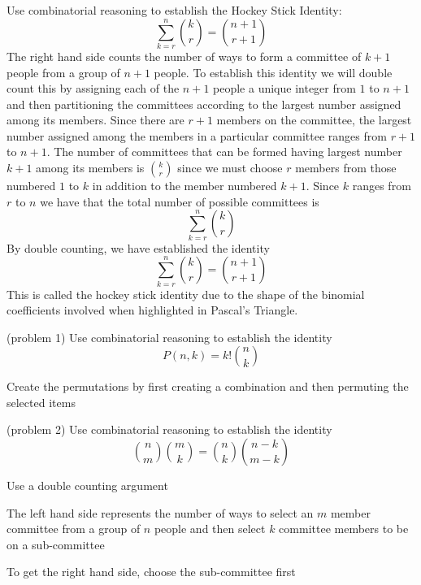 \documentclass[handout]{ximera}
\begin{document}
\begin{example}[example 5]
Use combinatorial reasoning to establish the Hockey Stick Identity:
\[
\sum_{k=r}^{n}\binom{k}{r}=\binom{n+1}{r+1} %
\]
The right hand side counts the number of ways to form a committee of $k+1$ people from a group of $n+1$ people.
To establish this identity we will double count this by assigning each of the $n+1$ people a unique 
integer from $1$ to $n+1$ and then partitioning the committees according to the largest number 
assigned among its members.
Since there are $r+1$ members on the committee, the largest number assigned among the 
members in a particular committee ranges from $r+1$ to $n+1$.
The number of committees that can be formed having largest number $k+1$ among its members
is $\binom{k}{r}$ since we must choose
$r$  members from those numbered $1$ to $k$ in addition to the member numbered $k+1$. 
Since $k$ ranges 
from $r$ to $n$ we have that the total number of possible committees is
\[
\sum_{k=r}^{n}\binom{k}{r}
\]
By double counting, we have established the identity
\[
\sum_{k=r}^{n}\binom{k}{r}=\binom{n+1}{r+1}
\]
This is called the hockey stick identity due to the shape of the binomial 
coefficients involved when highlighted in Pascal's Triangle.
\end{example}


\begin{problem}(problem 1)
Use combinatorial reasoning to establish the identity
\[
P(n,k) = k!\binom{n}{k}
\]
\begin{hint}
Create the permutations by first creating a combination and then permuting the selected items
\end{hint}
\end{problem}

\begin{problem}(problem 2)
Use combinatorial reasoning to establish the identity
\[
\binom{n}{m} \binom{m}{k} = \binom{n}{k} \binom{n-k}{m-k}
\]
\begin{hint}
Use a double counting argument
\end{hint}
\begin{hint}
The left hand side represents the number of ways to select an $m$ member committee from a group of $n$ people and then 
select $k$ committee members to be on a sub-committee
\end{hint}

\begin{hint}
To get the right hand side, choose the sub-committee first
\end{hint}
\end{problem}
\end{document}
